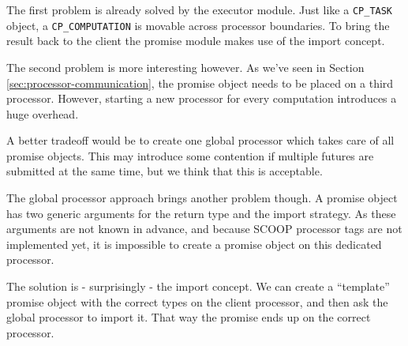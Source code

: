 The first problem is already solved by the executor module. 
Just like a \lstinline!CP_TASK! object, a \lstinline!CP_COMPUTATION! is movable across processor boundaries.
To bring the result back to the client the promise module makes use of the import concept.

The second problem is more interesting however.
As we've seen in Section \ref{sec:processor-communication}, the promise object needs to be placed on a third processor.
However, starting a new processor for every computation introduces a huge overhead.

A better tradeoff would be to create one global processor which takes care of all promise objects.
This may introduce some contention if multiple futures are submitted at the same time, but we think that this is acceptable.

The global processor approach brings another problem though.
A promise object has two generic arguments for the return type and the import strategy.
As these arguments are not known in advance, and because SCOOP processor tags \cite[p. 90]{Nienaltowski07} are not implemented yet, it is impossible to create a promise object on this dedicated processor.

The solution is - surprisingly - the import concept.
We can create a ``template'' promise object with the correct types on the client processor, and then ask the global processor to import it.
That way the promise ends up on the correct processor.
